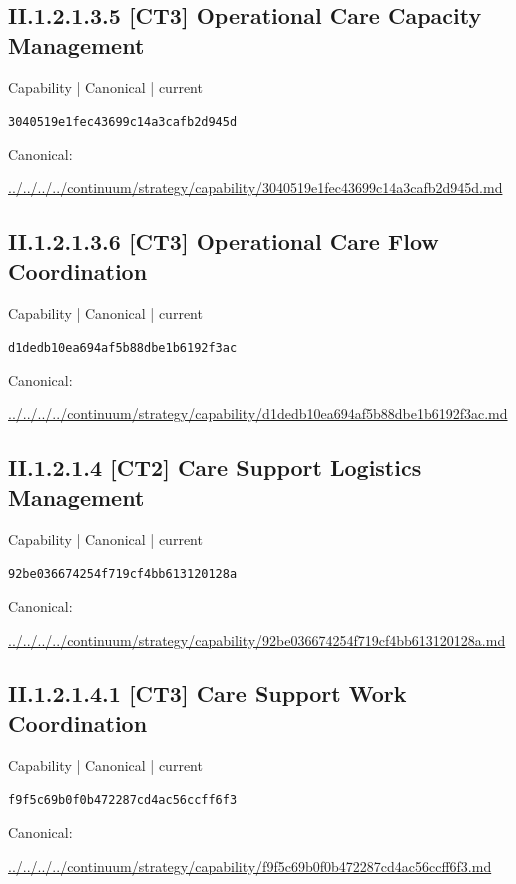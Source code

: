 \documentclass[10pt,a4paper]{article}
\begin{document}
\subsection*{II.1.2.1.3.5 [CT3] Operational Care Capacity Management}
\label{element-3040519e1fec43699c14a3cafb2d945d}
{\small Capability | Canonical | current}\par
\texttt{3040519e1fec43699c14a3cafb2d945d}\par
Canonical: \par
{\footnotesize\url{../../../../continuum/strategy/capability/3040519e1fec43699c14a3cafb2d945d.md}}\par
\subsection*{II.1.2.1.3.6 [CT3] Operational Care Flow Coordination}
\label{element-d1dedb10ea694af5b88dbe1b6192f3ac}
{\small Capability | Canonical | current}\par
\texttt{d1dedb10ea694af5b88dbe1b6192f3ac}\par
Canonical: \par
{\footnotesize\url{../../../../continuum/strategy/capability/d1dedb10ea694af5b88dbe1b6192f3ac.md}}\par
\subsection*{II.1.2.1.4 [CT2] Care Support Logistics Management}
\label{element-92be036674254f719cf4bb613120128a}
{\small Capability | Canonical | current}\par
\texttt{92be036674254f719cf4bb613120128a}\par
Canonical: \par
{\footnotesize\url{../../../../continuum/strategy/capability/92be036674254f719cf4bb613120128a.md}}\par
\subsection*{II.1.2.1.4.1 [CT3] Care Support Work Coordination}
\label{element-f9f5c69b0f0b472287cd4ac56ccff6f3}
{\small Capability | Canonical | current}\par
\texttt{f9f5c69b0f0b472287cd4ac56ccff6f3}\par
Canonical: \par
{\footnotesize\url{../../../../continuum/strategy/capability/f9f5c69b0f0b472287cd4ac56ccff6f3.md}}\par
\end{document}
